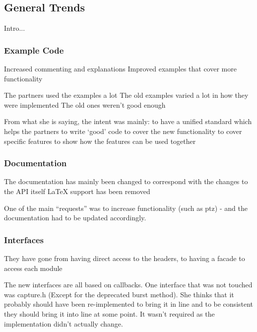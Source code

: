 \documentclass[conference]{IEEEtran}
\begin{document}
\subsection{General Trends}	

Intro...


\subsubsection{Example Code}


Increased commenting and explanations
Improved examples that cover more functionality



The partners used the examples a lot
The old examples varied a lot in how they were implemented
The old ones weren’t good enough

From what she is saying, the intent was mainly:
to have a unified standard
which helps the partners to write ‘good’ code
to cover the new functionality
to cover specific features
to show how the features can be used together





\subsubsection{Documentation}


The documentation has mainly been changed to correspond with the changes to the API itself
LaTeX support has been removed



One of the main “requests” was to increase functionality (such as ptz) - and the documentation had to be updated accordingly.








\subsubsection{Interfaces}

They have gone from having direct access to the headers, to having a facade to access each module

The new interfaces are all based on callbacks. 
One interface that was not touched was capture.h (Except for the deprecated burst method). She thinks that it probably should have been re-implemented to bring it in line and to be consistent they should bring it into line at some point. It wasn’t required as the implementation didn’t actually change.
\end{document}
